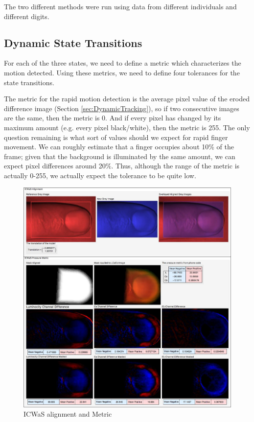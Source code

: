 The two different methods were run using data from different individuals and different digits. 



\subsection{Dynamic State Transitions}\label{sec:DynamicStateTransitions}
For each of the three states, we need to define a metric which characterizes the motion detected. Using these metrics, we need to define four tolerances for the state transitions.

The metric for the rapid motion detection is the average pixel value of the eroded difference image (Section \ref{sec:DynamicTracking}), so if two consecutive images are the same, then the metric is 0. And if every pixel has changed by its maximum amount (e.g. every pixel black/white), then the metric is 255. The only question remaining is what sort of values should we expect for rapid finger movement. We can roughly estimate that a finger occupies about 10\% of the frame; given that the background is illuminated by the same amount, we can expect pixel differences around 20\%. Thus, although the range of the metric is actually 0-255, we actually expect the tolerance to be quite low.

\begin{figure}[tbph]
\centering
\includegraphics[width=0.95\linewidth]{Chapter4/Figs/ICWaSAlignment&Metric}
\caption{ICWaS alignment and Metric}
\label{fig:icwasalignmentmetric}
\end{figure}

